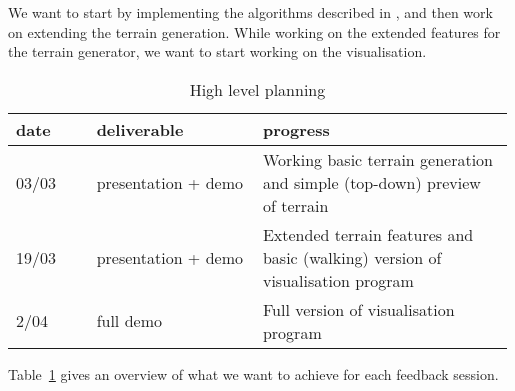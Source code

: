 We want to start by implementing the algorithms described in \cite{redblob}, and then work on extending the terrain generation.
While working on the extended features for the terrain generator, we want to start working on the visualisation.

\begin{table}[H]
	\centering
	\begin{tabular}{p{0.16\linewidth} p{0.33\linewidth} p{0.5\linewidth}}
		\textbf{date}& \textbf{deliverable}& \textbf{progress}\\\hline
		03/03& presentation + demo& Working basic terrain generation and simple (top-down) preview of terrain\\
		19/03& presentation + demo& Extended terrain features and basic (walking) version of visualisation program\\
		2/04& full demo& Full version of visualisation program\\
	\end{tabular}
	\caption{High level planning}
	\label{tab:plan}
\end{table}

Table~\ref{tab:plan} gives an overview of what we want to achieve for each feedback session.
